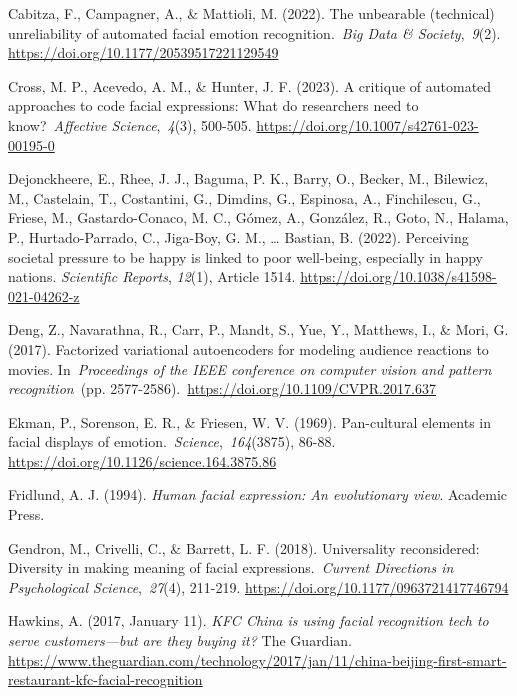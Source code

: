\documentclass[authordate, reflection,issue]{jote-new-article}
\begin{document}
	Cabitza, F., Campagner, A., \& Mattioli, M. (2022). The unbearable (technical) unreliability of automated facial emotion recognition. \emph{Big Data \& Society}, \emph{9}(2). \url{https://doi.org/10.1177/20539517221129549}



	Cross, M. P., Acevedo, A. M., \& Hunter, J. F. (2023). A critique of automated approaches to code facial expressions: What do researchers need to know? \emph{Affective Science}, \emph{4}(3), 500-505. \url{https://doi.org/10.1007/s42761-023-00195-0}



	Dejonckheere, E., Rhee, J. J., Baguma, P. K., Barry, O., Becker, M., Bilewicz, M., Castelain, T., Costantini, G., Dimdins, G., Espinosa, A., Finchilescu, G., Friese, M., Gastardo-Conaco, M. C., Gómez, A., González, R., Goto, N., Halama, P., Hurtado-Parrado, C., Jiga-Boy, G. M., … Bastian, B. (2022). Perceiving societal pressure to be happy is linked to poor well-being, especially in happy nations. \emph{Scientific Reports}, \emph{12}(1), Article 1514. \url{https://doi.org/10.1038/s41598-021-04262-z}



	Deng, Z., Navarathna, R., Carr, P., Mandt, S., Yue, Y., Matthews, I., \& Mori, G. (2017). Factorized variational autoencoders for modeling audience reactions to movies. In \emph{Proceedings of the IEEE conference on computer vision and pattern recognition} (pp. 2577-2586). \url{https://doi.org/10.1109/CVPR.2017.637}



	Ekman, P., Sorenson, E. R., \& Friesen, W. V. (1969). Pan-cultural elements in facial displays of emotion. \emph{Science}, \emph{164}(3875), 86-88. \url{https://doi.org/10.1126/science.164.3875.86}



	Fridlund, A. J. (1994). \emph{Human facial expression: An evolutionary view}. Academic Press.



	Gendron, M., Crivelli, C., \& Barrett, L. F. (2018). Universality reconsidered: Diversity in making meaning of facial expressions. \emph{Current Directions in Psychological Science}, \emph{27}(4), 211-219. \url{https://doi.org/10.1177/0963721417746794}



	Hawkins, A. (2017, January 11). \emph{KFC China is using facial recognition tech to serve } \emph{customers—but are they buying it?} The Guardian. \url{https://www.theguardian.com/technology/2017/jan/11/china-beijing-first-smart-restaurant-kfc-facial-recognition}
\end{document}
